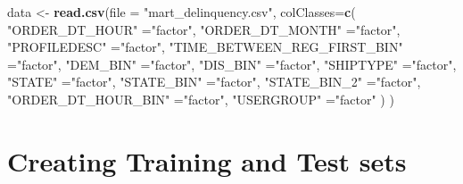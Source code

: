 \documentclass[
]{article}
\newenvironment{Shaded}{\begin{snugshade}}{\end{snugshade}}
\newcommand{\DataTypeTok}[1]{\textcolor[rgb]{0.13,0.29,0.53}{#1}}
\newcommand{\KeywordTok}[1]{\textcolor[rgb]{0.13,0.29,0.53}{\textbf{#1}}}
\newcommand{\NormalTok}[1]{#1}
\newcommand{\StringTok}[1]{\textcolor[rgb]{0.31,0.60,0.02}{#1}}
\begin{document}
\begin{Shaded}
\begin{Highlighting}[]
\NormalTok{data <-}\StringTok{ }\KeywordTok{read.csv}\NormalTok{(}\DataTypeTok{file =} \StringTok{"mart_delinquency.csv"}\NormalTok{,}
                 \DataTypeTok{colClasses=}\KeywordTok{c}\NormalTok{(}
                              \StringTok{"ORDER_DT_HOUR"}\NormalTok{              =}\StringTok{"factor"}\NormalTok{,}
                              \StringTok{"ORDER_DT_MONTH"}\NormalTok{             =}\StringTok{"factor"}\NormalTok{,}
                              \StringTok{"PROFILEDESC"}\NormalTok{                =}\StringTok{"factor"}\NormalTok{,}
                              \StringTok{"TIME_BETWEEN_REG_FIRST_BIN"}\NormalTok{ =}\StringTok{"factor"}\NormalTok{,}
                              \StringTok{"DEM_BIN"}\NormalTok{                    =}\StringTok{"factor"}\NormalTok{,}
                              \StringTok{"DIS_BIN"}\NormalTok{                    =}\StringTok{"factor"}\NormalTok{,}
                              \StringTok{"SHIPTYPE"}\NormalTok{                   =}\StringTok{"factor"}\NormalTok{,}
                              \StringTok{"STATE"}\NormalTok{                      =}\StringTok{"factor"}\NormalTok{,}
                              \StringTok{"STATE_BIN"}\NormalTok{                  =}\StringTok{"factor"}\NormalTok{,}
                              \StringTok{"STATE_BIN_2"}\NormalTok{                =}\StringTok{"factor"}\NormalTok{,}
                              \StringTok{"ORDER_DT_HOUR_BIN"}\NormalTok{          =}\StringTok{"factor"}\NormalTok{,}
                              \StringTok{"USERGROUP"}\NormalTok{                  =}\StringTok{"factor"}
\NormalTok{                             )}
\NormalTok{                )}
\end{Highlighting}
\end{Shaded}

\hypertarget{creating-training-and-test-sets}{%
\section{Creating Training and Test
sets}\label{creating-training-and-test-sets}}
\end{document}
